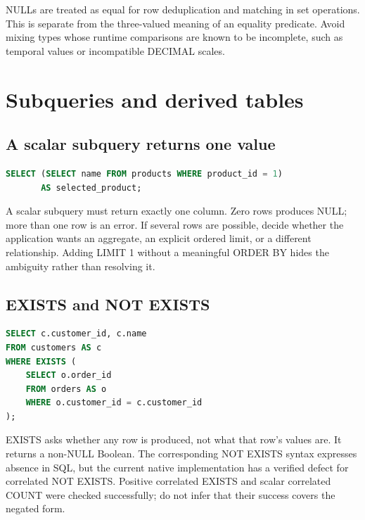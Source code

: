 NULLs are treated as equal for row deduplication and matching in set operations. This is separate from the three-valued meaning of an equality predicate. Avoid mixing types whose runtime comparisons are known to be incomplete, such as temporal values or incompatible DECIMAL scales.


\section{Subqueries and derived tables}
\label{sql:subqueries}

\subsection{A scalar subquery returns one value}

\begin{lstlisting}[language=SQL]
SELECT (SELECT name FROM products WHERE product_id = 1)
       AS selected_product;
\end{lstlisting}

A scalar subquery must return exactly one column. Zero rows produces NULL; more than one row is an error. If several rows are possible, decide whether the application wants an aggregate, an explicit ordered limit, or a different relationship. Adding LIMIT 1 without a meaningful ORDER BY hides the ambiguity rather than resolving it.

\subsection{EXISTS and NOT EXISTS}

\begin{lstlisting}[language=SQL]
SELECT c.customer_id, c.name
FROM customers AS c
WHERE EXISTS (
    SELECT o.order_id
    FROM orders AS o
    WHERE o.customer_id = c.customer_id
);
\end{lstlisting}

EXISTS asks whether any row is produced, not what that row's values are. It returns a non-NULL Boolean. The corresponding NOT EXISTS syntax expresses absence in SQL, but the current native implementation has a verified defect for correlated NOT EXISTS. Positive correlated EXISTS and scalar correlated COUNT were checked successfully; do not infer that their success covers the negated form.

